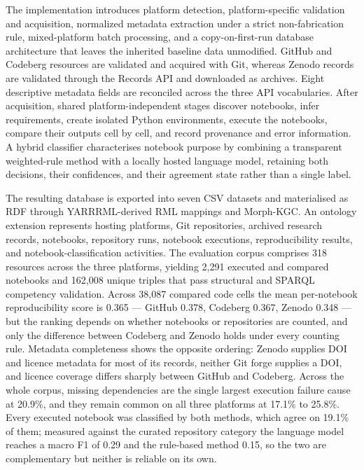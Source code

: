 \documentclass[a4paper,11pt,oneside,BCOR=1cm,DIV=12,toc=chapterentrywithdots,numbers=noenddot]{scrbook}
\begin{document}
The implementation introduces platform detection, platform-specific validation and acquisition, normalized metadata extraction under a strict non-fabrication rule, mixed-platform batch processing, and a copy-on-first-run database architecture that leaves the inherited baseline data unmodified. GitHub and Codeberg resources are validated and acquired with Git, whereas Zenodo records are validated through the Records API and downloaded as archives. Eight descriptive metadata fields are reconciled across the three API vocabularies. After acquisition, shared platform-independent stages discover notebooks, infer requirements, create isolated Python environments, execute the notebooks, compare their outputs cell by cell, and record provenance and error information. A hybrid classifier characterises notebook purpose by combining a transparent weighted-rule method with a locally hosted language model, retaining both decisions, their confidences, and their agreement state rather than a single label.

The resulting database is exported into seven CSV datasets and materialised as RDF through YARRRML-derived RML mappings and Morph-KGC. An ontology extension represents hosting platforms, Git repositories, archived research records, notebooks, repository runs, notebook executions, reproducibility results, and notebook-classification activities. The evaluation corpus comprises 318 resources across the three platforms, yielding 2{,}291 executed and compared notebooks and 162{,}008 unique triples that pass structural and SPARQL competency validation. Across 38{,}087 compared code cells the mean per-notebook reproducibility score is 0.365 --- GitHub 0.378, Codeberg 0.367, Zenodo 0.348 --- but the ranking depends on whether notebooks or repositories are counted, and only the difference between Codeberg and Zenodo holds under every counting rule. Metadata completeness shows the opposite ordering: Zenodo supplies DOI and licence metadata for most of its records, neither Git forge supplies a DOI, and licence coverage differs sharply between GitHub and Codeberg. Across the whole corpus, missing dependencies are the single largest execution failure cause at 20.9\%, and they remain common on all three platforms at 17.1\% to 25.8\%. Every executed notebook was classified by both methods, which agree on 19.1\% of them; measured against the curated repository category the language model reaches a macro F1 of 0.29 and the rule-based method 0.15, so the two are complementary but neither is reliable on its own.
\end{document}
